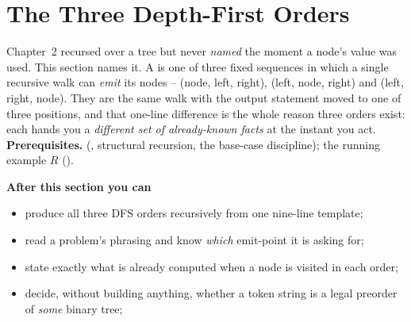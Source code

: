 \section{The Three Depth-First Orders}\label{sec:c03-dfs}

\begin{topicintro}
Chapter~2 recursed over a tree but never \emph{named} the moment a node's value was
used. This section names it. A  is one of three fixed
sequences in which a single recursive walk can \emph{emit} its nodes --
 (node, left, right),  (left, node, right) and
 (left, right, node). They are the same walk with the output
statement moved to one of three positions, and that one-line difference is the whole
reason three orders exist: each hands you a \emph{different set of already-known
facts} at the instant you act.
\textbf{Prerequisites.}  (, structural recursion, the
base-case discipline); the running example $R$ ().

\textbf{After this section you can}
\begin{itemize}[nosep]
  \item produce all three DFS orders recursively from one nine-line template;   \hfill{}
  \item read a problem's phrasing and know \emph{which} emit-point it is asking for; \hfill{}
  \item state exactly what is already computed when a node is visited in each order; \hfill{}
  \item decide, without building anything, whether a token string is a legal preorder
        of \emph{some} binary tree;                                             \hfill{}
\end{itemize}
\end{topicintro}

